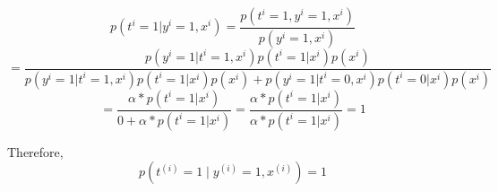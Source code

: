 \begin{answer}
  \begin{equation*}
      p(t^{i}=1|y^{i} = 1,x^{i}) = \frac{p(t^{i} = 1, y^{i} = 1, x^{i})}{p(y^{i} = 1, x^{i})}
  \end{equation*}
  \begin{equation*}
      = \frac{p(y^{i} = 1 |t^{i}=1,x^{i})p(t^{i}=1|x^{i})p(x^{i})}{p(y^{i} = 1 |t^{i}=1,x^{i})p(t^{i}=1|x^{i})p(x^{i}) + p(y^{i} = 1 |t^{i}=0,x^{i})p(t^{i} = 0|x^{i})p(x^{i})}
  \end{equation*}
  \begin{equation*}
      = \frac{\alpha*p(t^{i} = 1|x^{i})}{0 + \alpha*p(t^{i} = 1|x^{i})} = \frac{\alpha*p(t^{i} = 1|x^{i})}{\alpha*p(t^{i} = 1|x^{i})} = 1
  \end{equation*}
  
  Therefore, 
  \begin{equation*}
p(t^{(i)}=1\mid y^{(i)} = 1, x^{(i)}) = 1
\end{equation*}
\end{answer}
